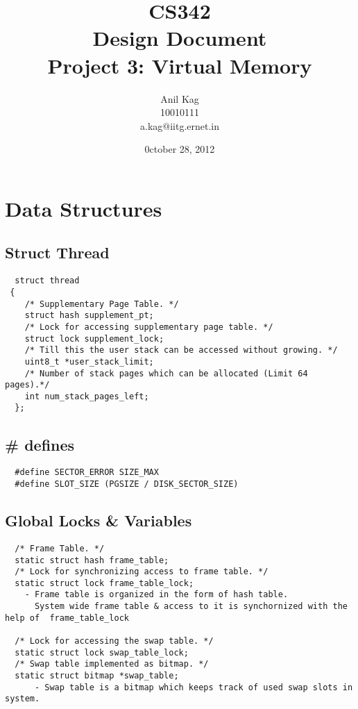 \documentclass[a4,11pt]{article}
\begin{document}
\title{CS342 \\
	Design Document\\
	Project 3: Virtual Memory}
\author{Anil Kag\\
	   10010111\\
	   a.kag@iitg.ernet.in}
\date{0ctober 28, 2012}
\maketitle

\section{Data Structures}
\subsection{Struct Thread}
\begin{lstlisting}
  struct thread
 {
    /* Supplementary Page Table. */
    struct hash supplement_pt;
    /* Lock for accessing supplementary page table. */
    struct lock supplement_lock;
    /* Till this the user stack can be accessed without growing. */
    uint8_t *user_stack_limit;
    /* Number of stack pages which can be allocated (Limit 64 pages).*/
    int num_stack_pages_left;
  };
\end{lstlisting}


\subsection{\# defines}
\begin{lstlisting}
  #define SECTOR_ERROR SIZE_MAX
  #define SLOT_SIZE (PGSIZE / DISK_SECTOR_SIZE)
\end{lstlisting}

\subsection{Global Locks \& Variables}
\begin{lstlisting}
  /* Frame Table. */
  static struct hash frame_table;
  /* Lock for synchronizing access to frame table. */
  static struct lock frame_table_lock;
	- Frame table is organized in the form of hash table.
	  System wide frame table & access to it is synchornized with the help of  frame_table_lock

  /* Lock for accessing the swap table. */
  static struct lock swap_table_lock;
  /* Swap table implemented as bitmap. */
  static struct bitmap *swap_table;
	  - Swap table is a bitmap which keeps track of used swap slots in system.
\end{lstlisting}
\end{document}
